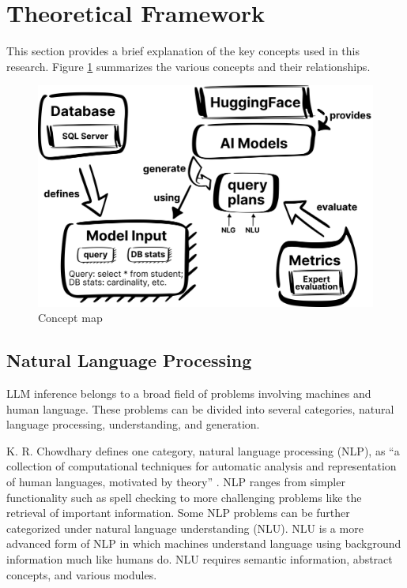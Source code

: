 \section{Theoretical Framework}\label{sec:theoryFrames}
This section provides a brief explanation of the key concepts used in this research. Figure \ref{fig:conceptMap} summarizes the various concepts and their relationships.

\begin{figure}[ht]
  \centering
  \includegraphics[width=\textwidth]{figures/llamaInferenceConceptMap.png}
  \caption{Concept map}
  \label{fig:conceptMap}
\end{figure}


\subsection{Natural Language Processing}
LLM inference belongs to a broad field of problems involving machines and human language. These problems can be divided into several categories, natural language processing, understanding, and generation.

K. R. Chowdhary defines one category, natural language processing (NLP), as ``a collection of computational techniques for automatic analysis and representation of human languages, motivated by theory'' \cite{chowdhary2020}. NLP ranges from simpler functionality such as spell checking to more challenging problems like the retrieval of important information. Some NLP problems can be further categorized under natural language understanding (NLU). NLU is a more advanced form of NLP in which machines understand language using background information much like humans do. NLU requires semantic information, abstract concepts, and various modules.

